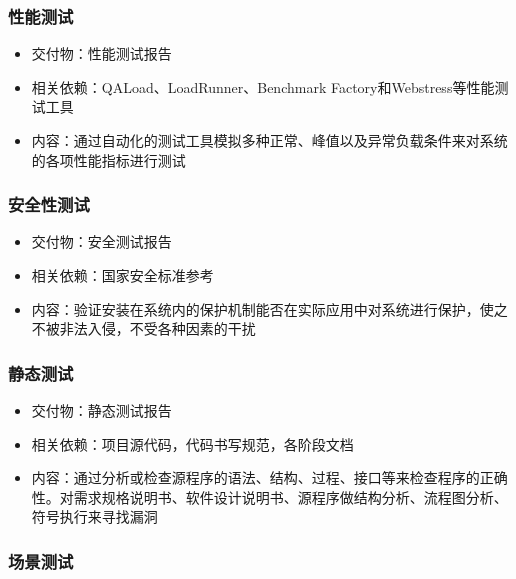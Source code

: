 \documentclass[hyperref, a4paper]{ctexart}
\providecommand{\tightlist}{%
  \setlength{\itemsep}{0pt}\setlength{\parskip}{0pt}}
\begin{document}
\hypertarget{ux6027ux80fdux6d4bux8bd5}{%
\subsubsection{性能测试}\label{ux6027ux80fdux6d4bux8bd5}}

\begin{itemize}
\tightlist
\item
  交付物：性能测试报告
\item
  相关依赖：QALoad、LoadRunner、Benchmark
  Factory和Webstress等性能测试工具
\item
  内容：通过自动化的测试工具模拟多种正常、峰值以及异常负载条件来对系统的各项性能指标进行测试
\end{itemize}

\hypertarget{ux5b89ux5168ux6027ux6d4bux8bd5}{%
\subsubsection{安全性测试}\label{ux5b89ux5168ux6027ux6d4bux8bd5}}

\begin{itemize}
\tightlist
\item
  交付物：安全测试报告
\item
  相关依赖：国家安全标准参考
\item
  内容：验证安装在系统内的保护机制能否在实际应用中对系统进行保护，使之不被非法入侵，不受各种因素的干扰
\end{itemize}

\hypertarget{ux9759ux6001ux6d4bux8bd5}{%
\subsubsection{静态测试}\label{ux9759ux6001ux6d4bux8bd5}}

\begin{itemize}
\tightlist
\item
  交付物：静态测试报告
\item
  相关依赖：项目源代码，代码书写规范，各阶段文档
\item
  内容：通过分析或检查源程序的语法、结构、过程、接口等来检查程序的正确性。对需求规格说明书、软件设计说明书、源程序做结构分析、流程图分析、符号执行来寻找漏洞
\end{itemize}

\hypertarget{ux573aux666fux6d4bux8bd5}{%
\subsubsection{场景测试}\label{ux573aux666fux6d4bux8bd5}}
\end{document}
